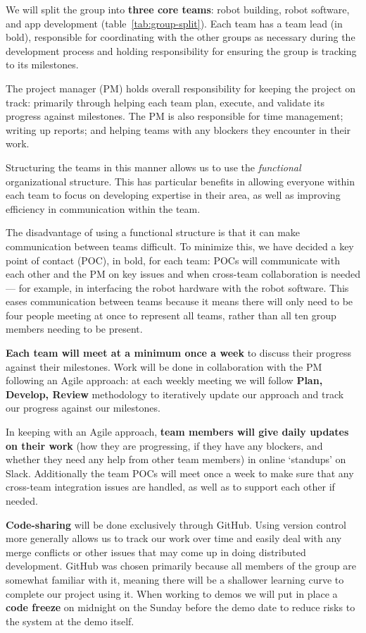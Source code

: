 \documentclass{article}
\begin{document}
We will split the group into {\bf three core teams}: robot building, robot software, and app development (table~\ref{tab:group-split}). Each team has a team lead (in bold), responsible for coordinating with the other groups as necessary during the development process and holding responsibility for ensuring the group is tracking to its milestones.

The project manager (PM) holds overall responsibility for keeping the project on track: primarily through helping each team plan, execute, and validate its progress against milestones. The PM is also responsible for time management; writing up reports; and helping teams with any blockers they encounter in their work.

Structuring the teams in this manner allows us to use the {\it functional} organizational structure. This has particular benefits in allowing everyone within each team to focus on developing expertise in their area, as well as improving efficiency in communication within the team.

The disadvantage of using a functional structure is that it can make communication between teams difficult. To minimize this, we have decided a key point of contact (POC), in bold, for each team: POCs will communicate with each other and the PM on key issues and when cross-team collaboration is needed --- for example, in interfacing the robot hardware with the robot software. This eases communication between teams because it means there will only need to be four people meeting at once to represent all teams, rather than all ten group members needing to be present.

{\bf Each team will meet at a minimum once a week} to discuss their progress against their milestones. Work will be done in collaboration with the PM following an Agile approach: at each weekly meeting we will follow {\bf Plan, Develop, Review} methodology to iteratively update our approach and track our progress against our milestones.

In keeping with an Agile approach, {\bf team members will give daily updates on their work} (how they are progressing, if they have any blockers, and whether they need any help from other team members) in online `standups' on Slack. Additionally the team POCs will meet once a week to make sure that any cross-team integration issues are handled, as well as to support each other if needed. 

{\bf Code-sharing} will be done exclusively through GitHub. Using version control more generally allows us to track our work over time and easily deal with any merge conflicts or other issues that may come up in doing distributed development. GitHub was chosen primarily because all members of the group are somewhat familiar with it, meaning there will be a shallower learning curve to complete our project using it. When working to demos we will put in place a {\bf code freeze} on midnight on the Sunday before the demo date to reduce risks to the system at the demo itself. 
\end{document}
